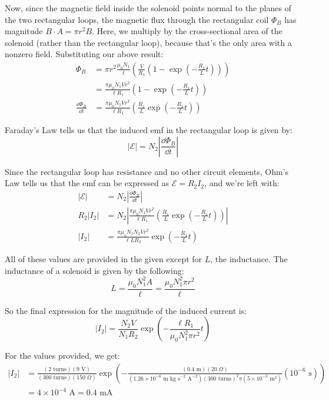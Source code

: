 \documentclass{article}
\begin{document}
Now, since the magnetic field inside the solenoid points normal to the planes of the two rectangular loops, the magnetic flux through the rectangular coil $\Phi_B$ has magnitude $B\cdot A = \pi r^2B$. Here, we multiply by the cross-sectional area of the solenoid (rather than the rectangular loop), because that's the only area with a nonzero field. Substituting our above result:
\begin{equation*}
\begin{aligned}
\Phi_B &= \pi r^2\frac{\mu_0N_1}{\ell}\left(\frac{V}{R_1}\left(1-\exp\left(-\frac{R_1}{L}t\right)\right)\right) \\
&= \frac{\pi\mu_0N_1Vr^2}{\ell R_1}\left(1-\exp\left(-\frac{R_1}{L}t\right)\right) \\
\frac{\dd\Phi_B}{\dd t} &= \frac{\pi\mu_0N_1Vr^2}{\ell R_1}\left(\frac{R_1}{L}\exp\left(-\frac{R_1}{L}t\right)\right)
\end{aligned}
\end{equation*}

Faraday's Law tells us that the induced emf in the rectangular loop is given by:
\[|\mathcal{E}| = N_2\left|\frac{\dd\Phi_B}{\dd t}\right|\]

Since the rectangular loop has resistance and no other circuit elements, Ohm's Law tells us that the emf can be expressed as $\mathcal{E} = R_2I_2$, and we're left with:
\begin{equation*}
\begin{aligned}
|\mathcal{E}| &= N_2\left|\frac{\dd\Phi_B}{\dd t}\right| \\
R_2|I_2| &= N_2\left|\frac{\pi\mu_0N_1Vr^2}{\ell R_1}\left(\frac{R_1}{L}\exp\left(-\frac{R_1}{L}t\right)\right)\right| \\
|I_2| &= \frac{\pi\mu_oN_1N_2Vr^2}{\ell LR_2}\exp\left(-\frac{R_1}{L}t\right)
\end{aligned}
\end{equation*}

All of these values are provided in the given except for $L$, the inductance. The inductance of a solenoid is given by the following:
\[ L = \frac{\mu_0N_1^2A}{\ell} = \frac{\mu_0N_1^2\pi r^2}{\ell} \]

So the final expression for the magnitude of the induced current is:
\begin{equation}
|I_2| = \frac{N_2V}{N_1 R_2}\exp\left(-\frac{\ell R_1}{\mu_0N_1^2\pi r^2}t\right)
\end{equation}

For the values provided, we get:
\begin{equation}
\begin{aligned}
|I_2| &= \frac{(2\text{ turns})(9\text{ V})}{(300\text{ turns})(150\;\Omega)}\exp\left(-\frac{(0.4\text{ m})(20\;\Omega)}{(1.26\times 10^{-6}\text{ m kg s}^{-2}\text{ A}^{-2})(300\text{ turns})^2\pi (5\times 10^{-3}\text{ m}^2)}(10^{-6}\text{ s})\right) \\
&= 4\times 10^{-4}\text{ A} = 0.4\text{ mA}
\end{aligned}
\end{equation}
\end{document}
